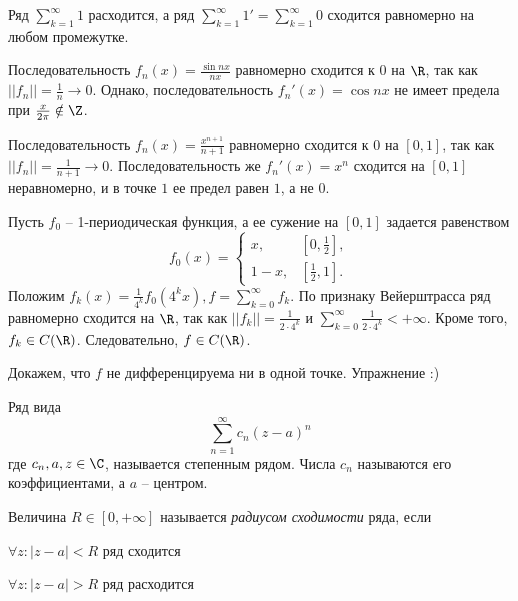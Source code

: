\begin{Example}
	Ряд $\sum_{k=1}^{\infty} 1$ расходится, а ряд $\sum_{k=1}^{\infty} 1' = \sum_{k=1}^{\infty} 0$ сходится равномерно на любом промежутке.  
\end{Example}

\begin{Example}
	Последовательность $f_n(x) = \frac{\sin nx}{nx}$ равномерно сходится к $0$ на $\R$, так как $||f_n|| = \frac{1}{n} \to 0$. Однако, последовательность $f_n'(x) = \cos nx$ не имеет предела при $\frac{x}{2\pi} \notin \Z$.  
\end{Example}

\begin{Example}
	Последовательность $f_n(x) = \frac{x^{n + 1}}{n + 1}$ равномерно сходится к $0$ на $[0, 1]$, так как $||f_n|| = \frac{1}{n + 1} \to 0$. Последовательность же $f_n'(x) = x^n$ сходится на $[0, 1]$ неравномерно, и в точке $1$ ее предел равен $1$, а не $0$.  
\end{Example}

\begin{Example}
	Пусть $f_0$ -- 1-периодическая функция, а ее сужение на $[0, 1]$ задается равенством
	\[f_0(x) = \begin{cases}
		x, &\left[0, \frac{1}{2}\right], \\
		1 - x, &\left[\frac{1}{2}, 1\right].
	\end{cases}\]
	Положим $f_k(x) = \frac{1}{4^k}f_0(4^k x), f = \sum_{k=0}^{\infty} f_k$. 
	По признаку Вейерштрасса ряд равномерно сходится на $\R$, так как $||f_k|| = \frac{1}{2 \cdot 4^k}$ и $\sum_{k=0}^{\infty} \frac{1}{2 \cdot 4^k} < +\infty$. Кроме того, $f_k \in C(\R)$. Следовательно, $f \in C(\R)$.
	
	Докажем, что $f$ не дифференцируема ни в одной точке. Упражнение :)
\end{Example}


\begin{Def}
	Ряд вида 
	\[\sum_{n=1}^{\infty} c_n(z - a)^n\]
	где $c_n, a, z \in \C$, называется степенным рядом. Числа $c_n$ называются его коэффициентами, а $a$ -- центром. 
\end{Def}

\begin{Def}
	Величина $R \in [0, +\infty]$ называется \textit{радиусом сходимости} ряда, если
	\begin{MyList}
		\item $\forall z : |z - a| < R$ ряд сходится
		\item $\forall z : |z - a| > R$ ряд расходится 
	\end{MyList} 
\end{Def}

